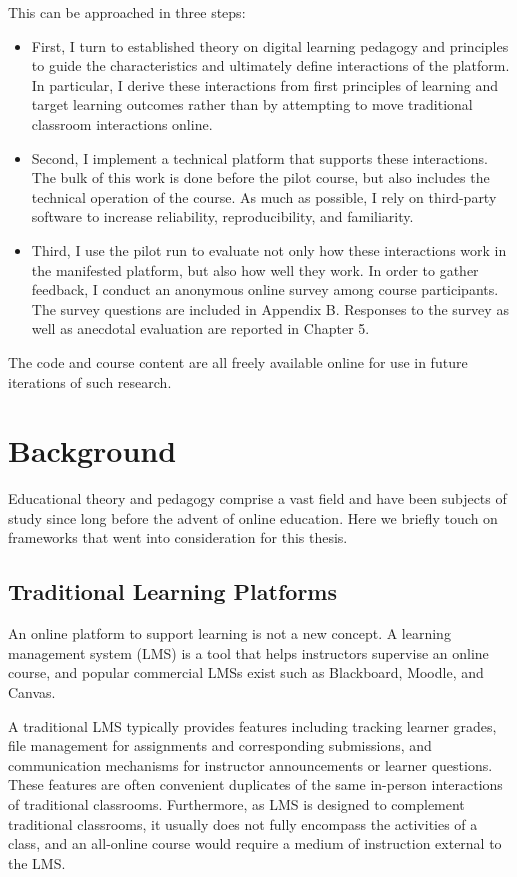 \documentclass[12pt,twoside,vi]{mitthesis}
\begin{document}
This can be approached in three steps:
\begin{itemize}
\item First, I turn to established theory on digital learning pedagogy and principles to guide the characteristics and ultimately define interactions of the platform. In particular, I derive these interactions from first principles of learning and target learning outcomes rather than by attempting to move traditional classroom interactions online.
\item Second, I implement a technical platform that supports these interactions. The bulk of this work is done before the pilot course, but also includes the technical operation of the course. As much as possible, I rely on third-party software to increase reliability, reproducibility, and familiarity.
\item Third, I use the pilot run to evaluate not only how these interactions work in the manifested platform, but also how well they work. In order to gather feedback, I conduct an anonymous online survey among course participants. The survey questions are included in Appendix B. Responses to the survey as well as anecdotal evaluation are reported in Chapter 5.
\end{itemize}

The code and course content are all freely available online for use in future iterations of such research.~\cite{rla}

\chapter{Background}

Educational theory and pedagogy comprise a vast field and have been subjects of study since long before the advent of online education. Here we briefly touch on frameworks that went into consideration for this thesis. 

\section{Traditional Learning Platforms}

An online platform to support learning is not a new concept. A learning management system (LMS) is a tool that helps instructors supervise an online course, and popular commercial LMSs exist such as Blackboard, Moodle, and Canvas. 

A traditional LMS typically provides features including tracking learner grades, file management for assignments and corresponding submissions, and communication mechanisms for instructor announcements or learner questions. These features are often convenient duplicates of the same in-person interactions of traditional classrooms. Furthermore, as LMS is designed to complement traditional classrooms, it usually does not fully encompass the activities of a class, and an all-online course would require a medium of instruction external to the LMS.~\cite{zagalsky2015emergence}
\end{document}
